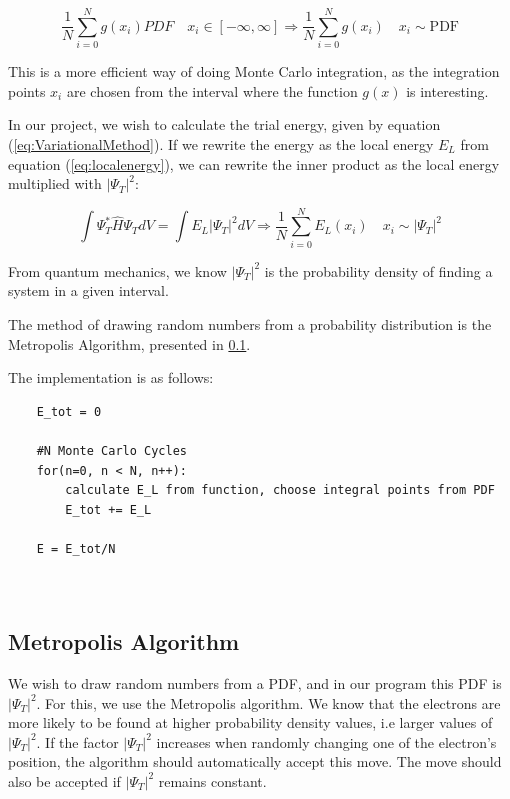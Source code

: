 \documentclass[norsk,a4paper,12pt]{article}
\begin{document}
\begin{equation}
    \frac{1}{N}\sum_{i=0}^N g(x_i) PDF \quad x_i \in [-\infty, \infty] \Rightarrow \frac{1}{N} \sum_{i=0}^N g(x_i) \quad x_i \sim \text{PDF}
    \label{MC_int_prob}
\end{equation}

This is a more efficient way of doing Monte Carlo integration, as the integration points $x_i$ are chosen from the interval where the function $g(x)$ is interesting.\par 

In our project, we wish to calculate the trial energy, given by equation (\ref{eq:VariationalMethod}). If we rewrite the energy as the local energy $E_L$ from equation (\ref{eq:localenergy}), we can rewrite the inner product as the local energy multiplied with $|\Psi_T|^2$:

\begin{equation}
    \int \Psi_T^* \hat{H} \Psi_T dV = \int E_L |\Psi_T|^2 dV \Rightarrow \frac{1}{N} \sum_{i=0}^N E_L(x_i) \quad x_i \sim |\Psi_T|^2  
\end{equation}

From quantum mechanics, we know $|\Psi_T|^2$ is the probability density of finding a system in a given interval. 

The method of drawing random numbers from a probability distribution is the Metropolis Algorithm, presented in \ref{MetropolisAlgorithm}. 

The implementation is as follows:

\begin{lstlisting}
    E_tot = 0
    
    #N Monte Carlo Cycles
    for(n=0, n < N, n++):
        calculate E_L from function, choose integral points from PDF
        E_tot += E_L
        
    E = E_tot/N
        
    
\end{lstlisting}

\subsection{Metropolis Algorithm} \label{MetropolisAlgorithm}
We wish to draw random numbers from a PDF, and in our program this PDF is $|\Psi_T|^2$. For this, we use the Metropolis algorithm. We know that the electrons are more likely to be found at higher probability density values, i.e larger values of $|\Psi_T|^2$. If the factor $|\Psi_T|^2$ increases when randomly changing one of the electron's position, the algorithm should automatically accept this move. The move should also be accepted if $|\Psi_T|^2$ remains constant.
\end{document}
